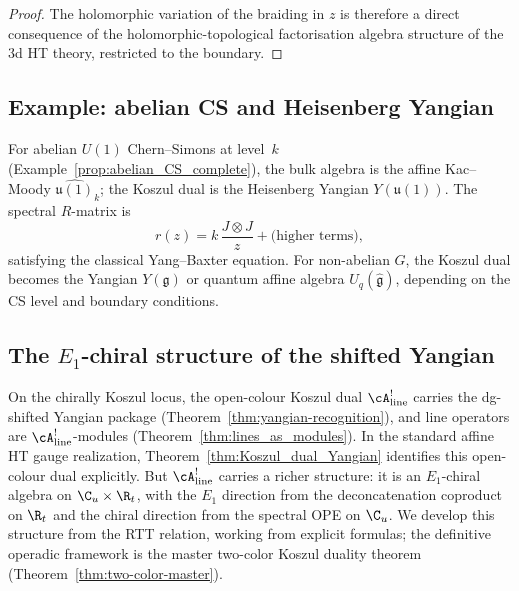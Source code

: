 \begin{proof}
The holomorphic variation of the braiding in $z$ is therefore a direct consequence of the holomorphic-topological factorisation algebra structure of the 3d HT theory, restricted to the boundary.
\end{proof}

\subsection{Example: abelian CS and Heisenberg Yangian}

\begin{example}
For abelian $U(1)$ Chern--Simons at level~$k$ (Example~\ref{prop:abelian_CS_complete}), the bulk algebra is the affine Kac--Moody $\widehat{\mathfrak{u}(1)}_k$; the Koszul dual is the Heisenberg Yangian $Y(\mathfrak{u}(1))$. The spectral $R$-matrix is
\begin{equation}
r(z) = k \, \frac{J \otimes J}{z} + \text{(higher terms)},
\end{equation}
satisfying the classical Yang--Baxter equation. For non-abelian $G$, the Koszul dual becomes the Yangian $Y(\mathfrak{g})$ or quantum affine algebra $U_q(\widehat{\mathfrak{g}})$, depending on the CS level and boundary conditions.
\end{example}


\subsection{The $E_1$-chiral structure of the shifted Yangian}

On the chirally Koszul locus, the open-colour Koszul dual
$\cA^!_{\mathrm{line}}$ carries the dg-shifted Yangian package
(Theorem~\ref{thm:yangian-recognition}), and line operators
are $\cA^!_{\mathrm{line}}$-modules (Theorem~\ref{thm:lines_as_modules}).
In the standard affine HT gauge realization,
Theorem~\ref{thm:Koszul_dual_Yangian} identifies this
open-colour dual explicitly. But $\cA^!_{\mathrm{line}}$ carries a richer structure: it is an $E_1$-chiral
algebra on $\C_u \times \R_t$, with the $E_1$ direction from
the deconcatenation coproduct on $\R_t$ and the chiral direction
from the spectral OPE on $\C_u$. We develop this structure
from the RTT relation, working from explicit formulas; the
definitive operadic framework is the master two-color Koszul
duality theorem (Theorem~\ref{thm:two-color-master}).

